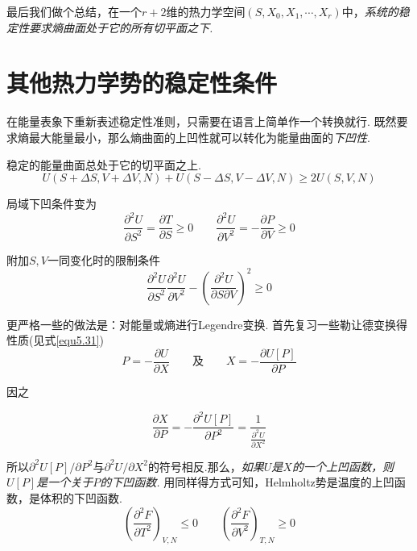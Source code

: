 最后我们做个总结，在一个$r+2$维的热力学空间$(S,X_0,X_1,\cdots,X_r)$中，{\it 系统的稳定性要求熵曲面处于它的所有切平面之下.}



\section{其他热力学势的稳定性条件}\label{sec8.2}
在能量表象下重新表述稳定性准则，只需要在语言上简单作一个转换就行. 既然要求熵最大能量最小，那么熵曲面的上凹性就可以转化为能量曲面的{\it 下凹性}.

稳定的能量曲面总处于它的切平面之上.
\begin{equation}
\label{equ8.8}
U(S+\Delta S,V+\Delta V,N)+U(S-\Delta S,V-\Delta V,N)\geq 2U(S,V,N)
\end{equation}

局域下凹条件变为
\begin{equation}
\label{equ8.9}
\frac{\partial^2U}{\partial S^2}=\frac{\partial T}{\partial S}\geq 0\qquad \frac{\partial^2U}{\partial V^2}=-\frac{\partial P}{\partial V}\geq 0
\end{equation}

附加$S,V$一同变化时的限制条件
\begin{equation}
\label{equ8.10}
\frac{\partial^2U}{\partial S^2}\frac{\partial^2U}{\partial V^2}-\left(\frac{\partial^2U}{\partial S\partial V}\right)^2\geq 0
\end{equation}

更严格一些的做法是：对能量或熵进行Legendre变换. 首先复习一些勒让德变换得性质(见式\eqref{equ5.31})
\begin{equation}
\label{equ8.11}
P=-\frac{\partial U}{\partial X}\qquad\text{及}\qquad X=-\frac{\partial U[P]}{\partial P}
\end{equation}

因之

\begin{equation}
\label{equ8.12}
\frac{\partial X}{\partial P}=-\frac{\partial^2U[P]}{\partial　P^2}=\dfrac{1}{\frac{\partial^2U}{\partial X^2}}
\end{equation}

所以$\partial^2U[P]/\partial P^2$与$\partial^2U/\partial X^2$的符号相反.那么，{\it 如果$U$是$X$的一个上凹函数，则$U[P]$是一个关于$P$的下凹函数.} 用同样得方式可知，Helmholtz势是温度的上凹函数，是体积的下凹函数.
\begin{equation}
\label{equ8.13}
\left(\frac{\partial^2 F}{\partial T^2}\right)_{V,N}\leq 0\qquad \left(\frac{\partial^2 F}{\partial V^2}\right)_{T,N}\geq 0
\end{equation}

